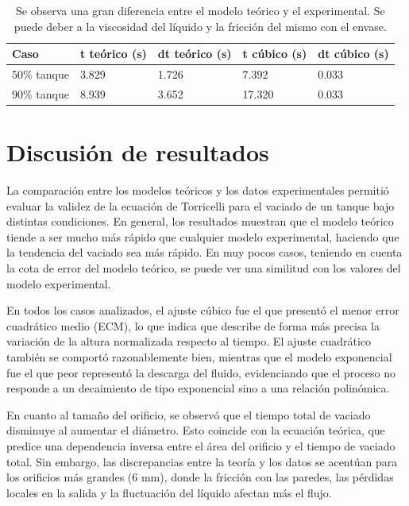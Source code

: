 \documentclass{article}
\begin{document}
\begin{table}[H]
    \centering
    \begin{center}
        \begin{tabular}{ | m{2cm} | m{2cm} | m{2cm} | m{2cm} | m{2cm} | }
            \hline Caso & t teórico (s) & dt teórico (s) & t cúbico (s) & dt cúbico (s) \\ 
            \hline 50\% tanque & 3.829 & 1.726 & 7.392 & 0.033 \\
            \hline 90\% tanque & 8.939 & 3.652 & 17.320 & 0.033 \\
            \hline
        \end{tabular}
    \end{center}
    \caption{Se observa una gran diferencia entre el modelo teórico y el experimental. Se puede deber a la viscosidad del líquido y la fricción del mismo con el envase.}
\end{table}


\newpage
\section{Discusión de resultados}

La comparación entre los modelos teóricos y los datos experimentales permitió evaluar la validez de la ecuación de Torricelli para el vaciado de un tanque bajo distintas condiciones.
En general, los resultados muestran que el modelo teórico tiende a ser mucho más rápido que cualquier modelo experimental, haciendo que la tendencia del vaciado sea más rápido. En muy pocos casos, teniendo en cuenta la cota de error del modelo teórico, se puede ver una similitud con los valores del modelo experimental.

En todos los casos analizados, el ajuste cúbico fue el que presentó el menor error cuadrático medio (ECM), lo que indica que describe de forma más precisa la variación de la altura normalizada respecto al tiempo.
El ajuste cuadrático también se comportó razonablemente bien, mientras que el modelo exponencial fue el que peor representó la descarga del fluido, evidenciando que el proceso no responde a un decaimiento de tipo exponencial sino a una relación polinómica.

En cuanto al tamaño del orificio, se observó que el tiempo total de vaciado disminuye al aumentar el diámetro.
Esto coincide con la ecuación teórica, que predice una dependencia inversa entre el área del orificio y el tiempo de vaciado total.
Sin embargo, las discrepancias entre la teoría y los datos se acentúan para los orificios más grandes (6 mm), donde la fricción con las paredes, las pérdidas locales en la salida y la fluctuación del líquido afectan más el flujo.
\end{document}

